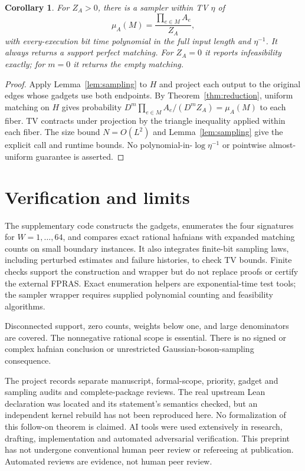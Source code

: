\documentclass[11pt]{article}
\newtheorem{corollary}[theorem]{Corollary}
\begin{document}
\begin{corollary}\label{cor:weighted-sampling}
For $Z_A>0$, there is a sampler within TV $\eta$ of
\[
 \mu_A(M)=\frac{\prod_{e\in M}A_e}{Z_A},
\]
with every-execution bit time polynomial in the full input length and $\eta^{-1}$. It always returns a support perfect matching. For $Z_A=0$ it reports infeasibility exactly; for $m=0$ it returns the empty matching.
\end{corollary}
\begin{proof}
Apply Lemma~\ref{lem:sampling} to $H$ and project each output to the original edges whose gadgets use both endpoints. By Theorem~\ref{thm:reduction}, uniform matching on $H$ gives probability $D^m\prod_{e\in M}A_e/(D^mZ_A)=\mu_A(M)$ to each fiber. TV contracts under projection by the triangle inequality applied within each fiber. The size bound $N=O(L^2)$ and Lemma~\ref{lem:sampling} give the explicit call and runtime bounds. No polynomial-in-$\log\eta^{-1}$ or pointwise almost-uniform guarantee is asserted.
\end{proof}

\section{Verification and limits}
The supplementary code constructs the gadgets, enumerates the four signatures for $W=1,\ldots,64$, and compares exact rational hafnians with expanded matching counts on small boundary instances. It also integrates finite-bit sampling laws, including perturbed estimates and failure histories, to check TV bounds. Finite checks support the construction and wrapper but do not replace proofs or certify the external FPRAS. Exact enumeration helpers are exponential-time test tools; the sampler wrapper requires supplied polynomial counting and feasibility algorithms.

Disconnected support, zero counts, weights below one, and large denominators are covered. The nonnegative rational scope is essential. There is no signed or complex hafnian conclusion or unrestricted Gaussian-boson-sampling consequence.

The project records separate manuscript, formal-scope, priority, gadget and sampling audits and complete-package reviews. The real upstream Lean declaration was located and its statement's semantics checked, but an independent kernel rebuild has not been reproduced here. No formalization of this follow-on theorem is claimed. AI tools were used extensively in research, drafting, implementation and automated adversarial verification. This preprint has not undergone conventional human peer review or refereeing at publication. Automated reviews are evidence, not human peer review.
\end{document}
